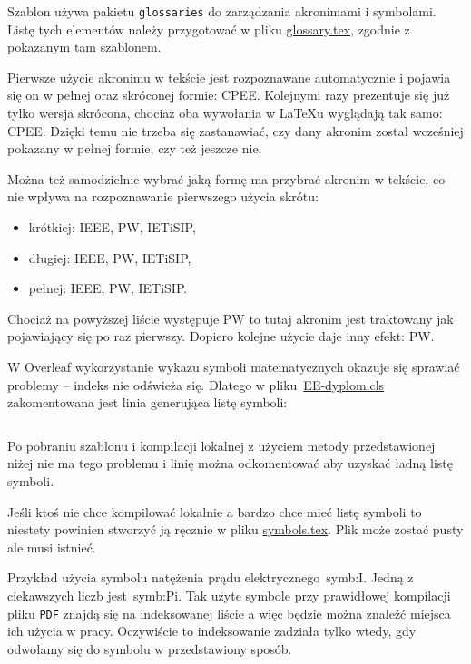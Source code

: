 Szablon używa pakietu \texttt{glossaries} do zarządzania akronimami i symbolami. Listę tych elementów należy przygotować w pliku \href{./glossary.tex}{glossary.tex}, zgodnie z pokazanym tam szablonem.

Pierwsze użycie akronimu w tekście jest rozpoznawane automatycznie i pojawia się on w pełnej oraz skróconej formie: \gls{CPEE}. Kolejnymi razy prezentuje się już tylko wersja skrócona, chociaż oba wywołania w \LaTeX{u} wyglądają tak samo: \gls{CPEE}. Dzięki temu nie trzeba się zastanawiać, czy dany akronim został wcześniej pokazany w pełnej formie, czy też jeszcze nie.

Można też samodzielnie wybrać jaką formę ma przybrać akronim w tekście, co nie wpływa na rozpoznawanie pierwszego użycia skrótu:
\begin{itemize}
    \item krótkiej: \acrshort{IEEE}, \acrshort{PW}, \acrshort{IETiSIP},
    \item długiej: \acrlong{IEEE}, \acrlong{PW}, \acrlong{IETiSIP},
    \item pełnej: \acrfull{IEEE}, \acrfull{PW}, \acrfull{IETiSIP}.
\end{itemize}

Chociaż na powyższej liście występuje \gls{PW} to tutaj akronim jest traktowany jak pojawiający się po raz pierwszy. Dopiero kolejne użycie daje inny efekt: \gls{PW}.

W Overleaf wykorzystanie wykazu symboli matematycznych okazuje się sprawiać problemy -- indeks nie odświeża się. Dlatego w pliku~\href{./EE-dyplom.cls}{EE-dyplom.cls} zakomentowana jest linia generująca listę symboli:
\begin{lstlisting}[language=TeX,
    firstnumber=666,
    caption=EE-dyplom.cls,
    label={lst:EE-dyplom}]
%    \printglossary[type=symbols,title={}] % problem z symbolami
\end{lstlisting}
Po pobraniu szablonu i kompilacji lokalnej z użyciem metody przedstawionej niżej nie ma tego problemu i linię można odkomentować aby uzyskać ładną listę symboli.

Jeśli ktoś nie chce kompilować lokalnie a bardzo chce mieć listę symboli to niestety powinien stworzyć ją ręcznie w pliku \href{./symbols.tex}{symbols.tex}. Plik może zostać pusty ale musi istnieć.

Przykład użycia symbolu natężenia prądu elektrycznego~\gls{symb:I}. Jedną z ciekawszych liczb jest~\gls{symb:Pi}. Tak użyte symbole przy prawidłowej kompilacji pliku \texttt{PDF} znajdą się na indeksowanej liście a więc będzie można znaleźć miejsca ich użycia w pracy. Oczywiście to indeksowanie zadziała tylko wtedy, gdy odwołamy się do symbolu w przedstawiony sposób.

